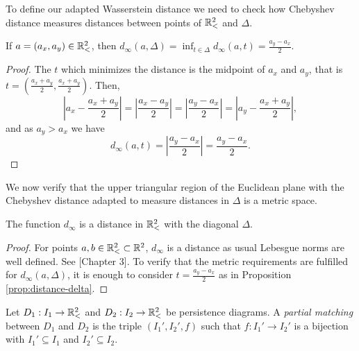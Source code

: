 To define our adapted Wasserstein distance we need to check how Chebyshev distance measures distances between points of $ \mathbb{R}_<^2 $ and $ \Delta $.

\begin{proposition} \label{prop:distance-delta}
    If $ a = (a_x, a_y) \in \mathbb{R}_<^2 $, then $ d_\infty(a, \Delta) = \inf_{t \in \Delta} d_\infty(a, t) = \frac{a_y - a_x}{2} $.
\end{proposition}
\begin{proof}
    The $ t $ which minimizes the distance is the midpoint of $ a_x $ and $ a_y $, that is $t = \left(\frac{a_x+a_y}{2}, \frac{a_x+a_y}{2}\right)  $. Then,
    \begin{equation}
        \left| a_x - \frac{a_x+a_y}{2} \right| = \left| \frac{a_x-a_y}{2}\right| = \left| \frac{a_y-a_x}{2}\right| = \left| a_y - \frac{a_x+a_y}{2} \right|,
    \end{equation}
    and as $ a_y > a_x $ we have
    \begin{equation}
        d_\infty(a, t) = \left|\frac{a_y - a_x}{2}\right| = \frac{a_y - a_x}{2}.
    \end{equation}
\end{proof}

We now verify that the upper triangular region of the Euclidean plane with the Chebyshev distance adapted to measure distances in $ \Delta $ is a metric space.
\begin{proposition}
    The function $ d_\infty $ is a distance in $ \mathbb{R}_<^2 $ with the diagonal $ \Delta $.
\end{proposition}
\begin{proof}
    For points $ a, b \in \mathbb{R}_<^2 \subset \mathbb R^2 $, $ d_\infty $ is a distance as usual Lebesgue norms are well defined. See \cite{rudin}[Chapter 3]. To verify that the metric requirements are fulfilled for $ d_\infty(a, \Delta) $, it is enough to consider $ t = \frac{a_y - a_x}{2} $ as in Proposition \ref{prop:distance-delta}.
\end{proof}

\begin{definition}
    Let $ D_1: I_1 \to \mathbb{R}_<^2 $ and $ D_2: I_2 \to \mathbb{R}_<^2 $ be persistence diagrams. A {\it partial matching} between $ D_1 $ and $ D_2 $ is the triple $ (I_1', I_2', f) $ such that $ f: I_1' \to I_2' $ is a bijection with $ I_1' \subseteq I_1 $ and $ I_2' \subseteq I_2 $.
\end{definition}

